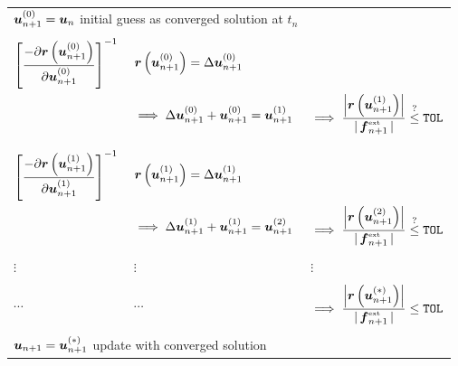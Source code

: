 \begin{hboxfloat*}
\caption{Newton-Raphson iterative procedure, 
explicated for the first and second iterations.}
\label{box:NewtonExplicated}
\begin{tabular}{lll} 
 \multicolumn{2}{l}{$\vunp^{(0)} = \vun$ 
initial guess as converged solution at $t_n$} 
 & %
 \\
 & %
 & %
 \\
 $\left[ \dst\frac{-\partial \vr 
 \left(\vunp^{(0)} \right)}{\partial \vunp^{(0)}} \right]^{-1}$
 & %
 $\vr \left( \vunp^{(0)} \right) = \Delta \vunp^{(0)}$
 & %
 \\
 & %
 $\implies \Delta \vunp^{(0)} + \vunp^{(0)} = \vunp^{(1)}$ 
 & %
 $\implies \dst\frac{\left| \vr 
 \left( \vunp^{(1)} \right) \right|}{\abs{\vfext_{n+1}}}  
 \overset{?}{\leq} \mbox{\tt TOL}$ 
 \\
%
 & %
 & %
 \\
 & %
 & %
 \\
 $\left[ \dst\frac{-\partial \vr 
 \left(\vunp^{(1)} \right)}{\partial \vunp^{(1)}} \right]^{-1}$
 & %
 $\vr \left( \vunp^{(1)} \right) = \Delta \vunp^{(1)}$
 & %
 \\
 & %
 $\implies \Delta \vunp^{(1)} + \vunp^{(1)} = \vunp^{(2)}$ 
 & %
 $\implies \dst\frac{\left| \vr 
 \left( \vunp^{(2)} \right) \right|}{\abs{\vfext_{n+1}}}  
 \overset{?}{\leq} \mbox{\tt TOL}$ 
 \\
%
 & %
 & %
 \\
   $\vdots$ 
 & %
   $\vdots$ 
 & %
   $\vdots$
 \\
 & %
 & %
 \\
   $\cdots$ 
 & %
   $\cdots$ 
 & %
   $\implies \dst\frac{\left| \vr 
   \left( \vunp^{(*)} \right) \right|}{\abs{\vfext_{n+1}}} 
   \leq \mbox{\tt TOL}$ 
 \\
 & %
 & %
 \\
\multicolumn{2}{l}{$\vunp = \vunp^{(*)}$ update with converged solution} & \\
\end{tabular}
\end{hboxfloat*}

